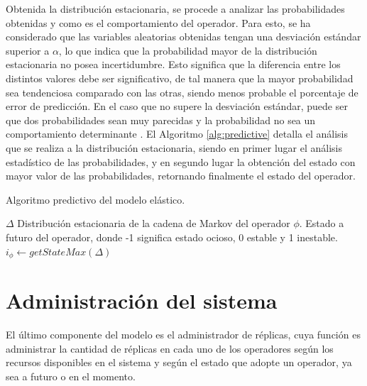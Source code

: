 Obtenida la distribución estacionaria, se procede a analizar las probabilidades obtenidas y como es el comportamiento del operador. Para esto, se ha considerado que las variables aleatorias obtenidas tengan una desviación estándar superior a $\alpha$, lo que indica que la probabilidad mayor de la distribución estacionaria no posea incertidumbre. \normalsize{Esto significa que la diferencia entre los distintos valores debe ser significativo, de tal manera que la mayor probabilidad sea tendenciosa comparado con las otras, siendo menos probable el porcentaje de error de predicción.} En el caso que no supere la desviación estándar, puede ser que dos probabilidades sean muy parecidas y la probabilidad no sea un comportamiento determinante \citep{soong2004fundamentals}. El Algoritmo \ref{alg:predictive} detalla el análisis que se realiza a la distribución estacionaria, siendo en primer lugar el análisis estadístico de las probabilidades, y en segundo lugar la obtención del estado con mayor valor de las probabilidades, retornando finalmente el estado del operador.

\begin{algorithm}[t]
	\caption{Algoritmo predictivo del modelo elástico.}
	\label{alg:predictive}
	\begin{algorithmic}[1]
	\REQUIRE$\Delta$ Distribución estacionaria de la cadena de Markov del operador $\phi$.
	\ENSURE Estado a futuro del operador, donde -1 significa estado ocioso, 0 estable y 1 inestable.
		\STATE $i_{\phi} \leftarrow getStateMax(\Delta)$ 
	\ENDIF
	
	
	\end{algorithmic}
\end{algorithm}

\section{Administración del sistema}

El último componente del modelo es el administrador de réplicas, cuya función es administrar la cantidad de réplicas en cada uno de los operadores según los recursos disponibles en el sistema y según el estado que adopte un operador, ya sea a futuro o en el momento.


